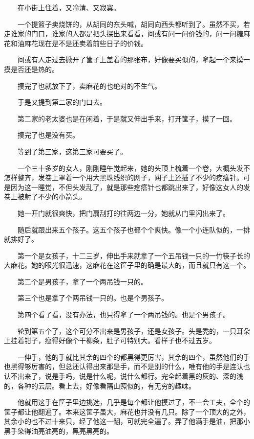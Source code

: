 \documentclass[UTF8]{ctexart}
\begin{document}
　　在小街上住着，又冷清、又寂寞。

　　一个提篮子卖烧饼的，从胡同的东头喊，胡同向西头都听到了。虽然不买，若走谁家的门口，谁家的人都是把头探出来看看，间或有问一问价钱的，问一问糖麻花和油麻花现在是不是还卖着前些日子的价钱。

　　间或有人走过去掀开了筐子上盖着的那张布，好像要买似的，拿起一个来摸一摸是否还是热的。

　　摸完了也就放下了，卖麻花的也绝对的不生气。

　　于是又提到第二家的门口去。

　　第二家的老太婆也是在闲着，于是就又伸出手来，打开筐子，摸了一回。

　　摸完了也是没有买。

　　等到了第三家，这第三家可要买了。

　　一个三十多岁的女人，刚刚睡午觉起来，她的头顶上梳着一个卷，大概头发不怎样整齐，发卷上罩着一个用大黑珠线织的网子，网子上还插了不少的疙瘩针。可是因为这一睡觉，不但头发乱了，就是那些疙瘩针也都跳出来了，好像这女人的发卷上被射了不少的小箭头。

　　她一开门就很爽快，把门扇刮打的往两边一分，她就从门里闪出来了。

　　随后就跟出来五个孩子。这五个孩子也都个个爽快。像一个小连队似的，一排就排好了。

　　第一个是女孩子，十二三岁，伸出手来就拿了一个五吊钱一只的一竹筷子长的大麻花。她的眼光很迅速，这麻花在这筐子里的确是最大的，而且就只有这一个。

　　第二个是男孩子，拿了一个两吊钱一只的。

　　第三个也是拿了个两吊钱一只的。也是个男孩子。

　　第四个看了看，没有办法，也只得拿了一个两吊钱的。也是个男孩子。

　　轮到第五个了，这个可分不出来是男孩子，还是女孩子。头是秃的，一只耳朵上挂着钳子，瘦得好像个干柳条，肚子可特别大。看样子也不过五岁。

　　一伸手，他的手就比其余的四个的都黑得更厉害，其余的四个，虽然他们的手也黑得够厉害的，但总还认得出来那是手，而不是别的什么，唯有他的手是连认也认不出来了，说是手吗，说是什么呢，说什么都行。完全起着黑的灰的、深的浅的，各种的云层。看上去，好像看隔山照似的，有无穷的趣味。

　　他就用这手在筐子里边挑选，几乎是每个都让他摸过了，不一会工夫，全个的筐子都让他翻遍了。本来这筐子虽大，麻花也并没有几只。除了一个顶大的之外，其余小的也不过十来只，经了他这一翻，可就完全遍了。弄了他满手是油，把那小黑手染得油亮油亮的，黑亮黑亮的。
\end{document}
